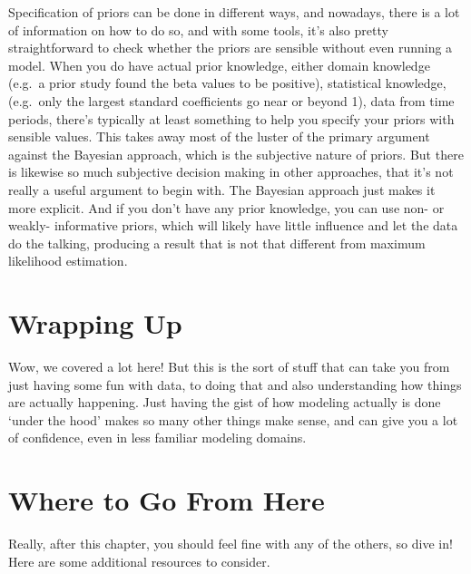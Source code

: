 \documentclass[
  letterpaper,
]{krantz}
\begin{document}
\begin{tcolorbox}[enhanced jigsaw, bottomrule=.15mm, rightrule=.15mm, colframe=quarto-callout-tip-color-frame, colback=white, breakable, arc=.35mm, left=2mm, opacityback=0, leftrule=.75mm, toprule=.15mm]

Specification of priors can be done in different ways, and nowadays,
there is a lot of information on how to do so, and with some tools, it's
also pretty straightforward to check whether the priors are sensible
without even running a model. When you do have actual prior knowledge,
either domain knowledge (e.g.~a prior study found the beta values to be
positive), statistical knowledge, (e.g.~only the largest standard
coefficients go near or beyond 1), data from time periods, there's
typically at least something to help you specify your priors with
sensible values. This takes away most of the luster of the primary
argument against the Bayesian approach, which is the subjective nature
of priors. But there is likewise so much subjective decision making in
other approaches, that it's not really a useful argument to begin with.
The Bayesian approach just makes it more explicit. And if you don't have
any prior knowledge, you can use non- or weakly- informative priors,
which will likely have little influence and let the data do the talking,
producing a result that is not that different from maximum likelihood
estimation.

\end{tcolorbox}

\section{Wrapping Up}\label{sec-estim-wrap}

Wow, we covered a lot here! But this is the sort of stuff that can take
you from just having some fun with data, to doing that and also
understanding how things are actually happening. Just having the gist of
how modeling actually is done `under the hood' makes so many other
things make sense, and can give you a lot of confidence, even in less
familiar modeling domains.

\section{Where to Go From Here}\label{sec-estim-where-to-go}

Really, after this chapter, you should feel fine with any of the others,
so dive in! Here are some additional resources to consider.
\end{document}
